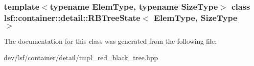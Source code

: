 \subsubsection*{template$<$typename ElemType, typename SizeType$>$ class lsf::container::detail::RBTreeState$<$ ElemType, SizeType $>$}



The documentation for this class was generated from the following file:\begin{DoxyCompactItemize}
\item 
dev/lsf/container/detail/impl\_\-red\_\-black\_\-tree.hpp\end{DoxyCompactItemize}
